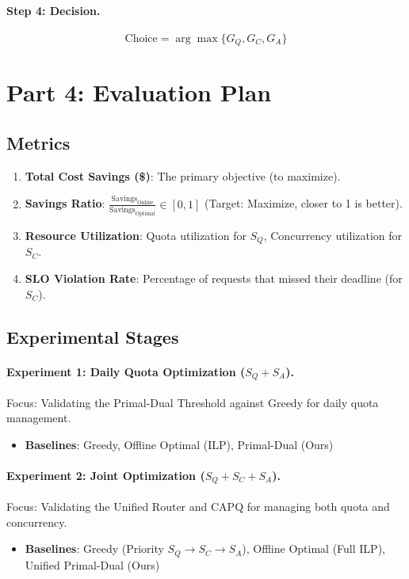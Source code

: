 \documentclass[11pt]{article}
\begin{document}
\paragraph{Step 4: Decision.}
\[ \text{Choice} = \arg\max \{ G_Q, G_C, G_A \} \]

\section{Part 4: Evaluation Plan}
\label{sec:part4}

\subsection{Metrics}
\begin{enumerate}
  \item \textbf{Total Cost Savings (\$)}: The primary objective (to maximize).
  \item \textbf{Savings Ratio}: $\frac{\text{Savings}_{\text{Online}}}{\text{Savings}_{\text{Optimal}}} \in [0, 1]$ (Target: Maximize, closer to 1 is better).
  \item \textbf{Resource Utilization}: Quota utilization for $S_Q$, Concurrency utilization for $S_C$.
  \item \textbf{SLO Violation Rate}: Percentage of requests that missed their deadline (for $S_C$).
\end{enumerate}

\subsection{Experimental Stages}

\paragraph{Experiment 1: Daily Quota Optimization ($S_Q + S_A$).}
Focus: Validating the Primal-Dual Threshold against Greedy for daily quota management.
\begin{itemize}
  \item \textbf{Baselines}: Greedy, Offline Optimal (ILP), Primal-Dual (Ours)
\end{itemize}

\paragraph{Experiment 2: Joint Optimization ($S_Q + S_C + S_A$).}
Focus: Validating the Unified Router and CAPQ for managing both quota and concurrency.
\begin{itemize}
  \item \textbf{Baselines}: Greedy (Priority $S_Q \to S_C \to S_A$), Offline Optimal (Full ILP), Unified Primal-Dual (Ours)
\end{itemize}
\end{document}
